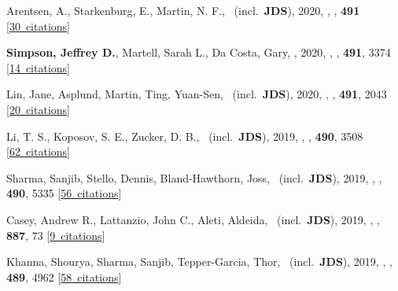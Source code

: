 \item[{\color{numcolor}\scriptsize39}] Arentsen, A., Starkenburg, E., Martin, N. F., \etal\ (incl.\ \textbf{JDS}), 2020, , \mnras, \textbf{491} [\href{https://ui.adsabs.harvard.edu/#abs/2020MNRAS.491L..11A}{30~citations}]

\item[{\color{numcolor}\scriptsize38}] \textbf{Simpson, Jeffrey D.}, Martell, Sarah L., Da Costa, Gary, \etal, 2020, , \mnras, \textbf{491}, 3374 [\href{https://ui.adsabs.harvard.edu/#abs/2020MNRAS.491.3374S}{14~citations}]

\item[{\color{numcolor}\scriptsize37}] Lin, Jane, Asplund, Martin, Ting, Yuan-Sen, \etal\ (incl.\ \textbf{JDS}), 2020, , \mnras, \textbf{491}, 2043 [\href{https://ui.adsabs.harvard.edu/#abs/2020MNRAS.491.2043L}{20~citations}]

\item[{\color{numcolor}\scriptsize36}] Li, T. S., Koposov, S. E., Zucker, D. B., \etal\ (incl.\ \textbf{JDS}), 2019, , \mnras, \textbf{490}, 3508 [\href{https://ui.adsabs.harvard.edu/#abs/2019MNRAS.490.3508L}{62~citations}]

\item[{\color{numcolor}\scriptsize35}] Sharma, Sanjib, Stello, Dennis, Bland-Hawthorn, Joss, \etal\ (incl.\ \textbf{JDS}), 2019, , \mnras, \textbf{490}, 5335 [\href{https://ui.adsabs.harvard.edu/#abs/2019MNRAS.490.5335S}{56~citations}]

\item[{\color{numcolor}\scriptsize34}] Casey, Andrew R., Lattanzio, John C., Aleti, Aldeida, \etal\ (incl.\ \textbf{JDS}), 2019, , \apj, \textbf{887}, 73 [\href{https://ui.adsabs.harvard.edu/#abs/2019ApJ...887...73C}{9~citations}]

\item[{\color{numcolor}\scriptsize33}] Khanna, Shourya, Sharma, Sanjib, Tepper-Garcia, Thor, \etal\ (incl.\ \textbf{JDS}), 2019, , \mnras, \textbf{489}, 4962 [\href{https://ui.adsabs.harvard.edu/#abs/2019MNRAS.489.4962K}{58~citations}]


